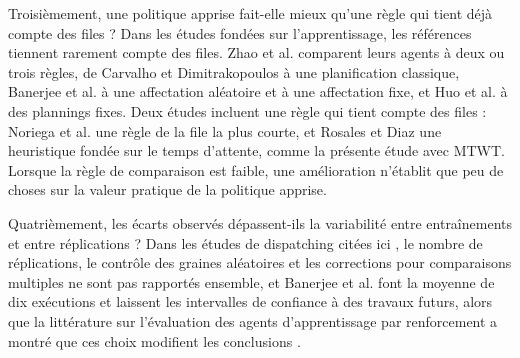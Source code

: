 \documentclass[11pt,a4paper]{article}
\newif\ifrevmarks
\newcommand{\revtag}[1]{\ifrevmarks\textsuperscript{\textcolor{red!70!black}{\scriptsize[#1]}}\fi}
\newenvironment{revbloc}[1]{\par\ifrevmarks\color{revcolor}\noindent\revtag{#1}\ \fi}{\par}
\newif\ifcorrmarks
\newcommand{\corr}[1]{\ifcorrmarks\textcolor{corrcolor}{#1}\else#1\fi}
\begin{document}
\begin{revbloc}{M24 (fusion §1.3, §2.4, §3)}
\corr{Troisièmement, une politique apprise fait-elle mieux qu'une règle qui tient déjà compte des files ? Dans les études fondées sur l'apprentissage, les références tiennent rarement compte des files.} \corr{Zhao et al. \cite{Zhao2025} comparent leurs agents à deux ou trois règles, de Carvalho et Dimitrakopoulos \cite{deCarvalho2023} à une planification classique, Banerjee et al. \cite{Banerjee2025} à une affectation aléatoire et à une affectation fixe, et Huo et al. \cite{Huo2024} à des plannings fixes. Deux études incluent une règle qui tient compte des files : Noriega et al. \cite{Noriega2025} une règle de la file la plus courte, et Rosales et Diaz \cite{FranciscoRosales2025} une heuristique fondée sur le temps d'attente, comme la présente étude avec MTWT.} Lorsque la règle de comparaison est faible, une amélioration n'établit que peu de choses sur la valeur pratique de la politique apprise.

\corr{Quatrièmement, les écarts observés dépassent-ils la variabilité entre entraînements et entre réplications ?} \corr{Dans les études de dispatching citées ici \cite{MehrnazMohtasham2023, MiladAbolghasemian2020, BurakOzdemir2019}, le nombre de réplications, le contrôle des graines aléatoires et les corrections pour comparaisons multiples ne sont pas rapportés ensemble, et Banerjee et al. \cite{Banerjee2025} font la moyenne de dix exécutions et laissent les intervalles de confiance à des travaux futurs,} alors que la littérature sur l'évaluation des agents d'apprentissage par renforcement a montré que ces choix modifient les conclusions \cite{Henderson2018, Agarwal2021}.


\end{revbloc}
\end{document}
